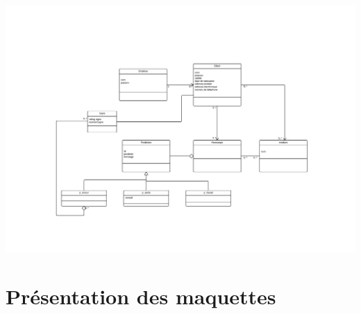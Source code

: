 \documentclass[letterpaper,10pt,french]{sphinxmanual}
\begin{document}
{\hfill\includegraphics{uml.png}\hfill}


\section{Présentation des maquettes}
\label{maquette:presentation-des-maquettes}\label{maquette::doc}
\end{document}
